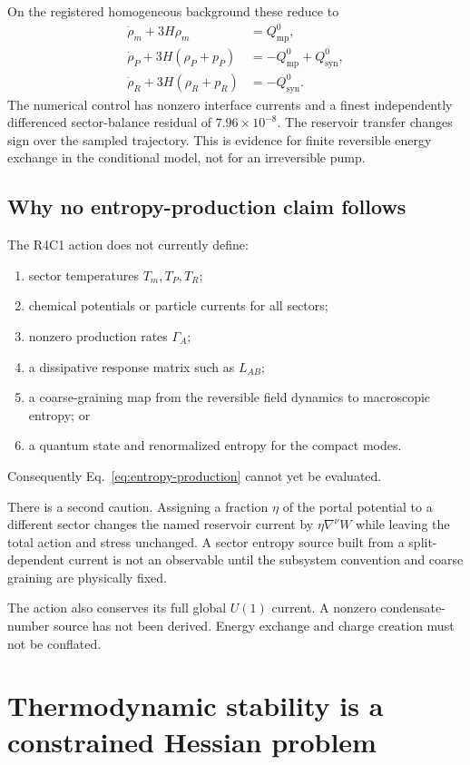 \documentclass[aps,prd,reprint,superscriptaddress,nofootinbib,floatfix]{revtex4-2}
\newcommand{\Qmp}{Q_{\mathrm{mp}}}
\newcommand{\Qsyn}{Q_{\mathrm{syn}}}
\begin{document}
On the registered homogeneous background these reduce to
\begin{align}
 \dot\rho_m+3H\rho_m&=\Qmp^0,\\
 \dot\rho_P+3H(\rho_P+p_P)&=-\Qmp^0+\Qsyn^0,\\
 \dot\rho_R+3H(\rho_R+p_R)&=-\Qsyn^0.
 \label{eq:r4c1-frw}
\end{align}
The numerical control has nonzero interface currents and a finest independently
differenced sector-balance residual of \(7.96\times10^{-8}\).  The reservoir
transfer changes sign over the sampled trajectory.  This is evidence for
finite reversible energy exchange in the conditional model, not for an
irreversible pump.

\subsection{Why no entropy-production claim follows}

The R4C1 action does not currently define:
\begin{enumerate}
\item sector temperatures \(T_m,T_P,T_R\);
\item chemical potentials or particle currents for all sectors;
\item nonzero production rates \(\Gamma_A\);
\item a dissipative response matrix such as \(L_{AB}\);
\item a coarse-graining map from the reversible field dynamics to macroscopic
entropy; or
\item a quantum state and renormalized entropy for the compact modes.
\end{enumerate}
Consequently Eq.~\eqref{eq:entropy-production} cannot yet be evaluated.

There is a second caution.  Assigning a fraction \(\eta\) of the portal
potential to a different sector changes the named reservoir current by
\(\eta\nabla^\nu W\) while leaving the total action and stress unchanged.
A sector entropy source built from a split-dependent current is not an
observable until the subsystem convention and coarse graining are physically
fixed.

The action also conserves its full global \(U(1)\) current.  A nonzero
condensate-number source has not been derived.  Energy exchange and charge
creation must not be conflated.

\section{Thermodynamic stability is a constrained Hessian problem}
\label{sec:stability}
\end{document}
